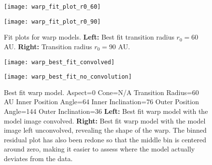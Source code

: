 \documentclass[a4paper]{tufte-handout}
\begin{document}
\begin{figure}[!p]
  \label{fig:warp fit plots}
  \centering
  \caption[Warp Fit Plots]{Fit plots for warp models. \newline
  \noindent \textbf{Left:} Best fit transition radius $r_0=60$ AU. \newline
  \noindent \textbf{Right:} Transition radius $r_0=90$ AU.}
  \begin{minipage}{.5\textwidth}
    \texttt{[image: warp\_fit\_plot\_r0\_60]}
  \end{minipage}%
  \begin{minipage}{.5\textwidth}
    \texttt{[image: warp\_fit\_plot\_r0\_90]}
  \end{minipage}
\end{figure}

\begin{figure}[!p]
  \label{fig:warp models}
  \centering
  \caption[Warp Best Fit Model]{Best fit warp model. \newline
     Aspect=0 \newline
     Cone=N/A \newline
     Transition Radius=60 AU \newline
     Inner Position Angle=64 \newline
     Inner Inclination=76 \newline
     Outer Position Angle=144 \newline
     Outer Inclination=36 \newline
  \noindent \textbf{Left:} Best fit warp model with the model image convolved. \newline
  \noindent \textbf{Right:} Best fit warp model with the model image left unconvolved, revealing the shape of the warp. The binned residual plot has also been redone so that the middle bin is centered around zero, making it easier to assess where the model actually deviates from the data.}
  \begin{minipage}{.5\textwidth}
    \texttt{[image: warp\_best\_fit\_convolved]}
  \end{minipage}%
  \begin{minipage}{.5\textwidth}
    \texttt{[image: warp\_best\_fit\_no\_convolution]}
  \end{minipage}
\end{figure}
\clearpage

\newpage


\end{document}
